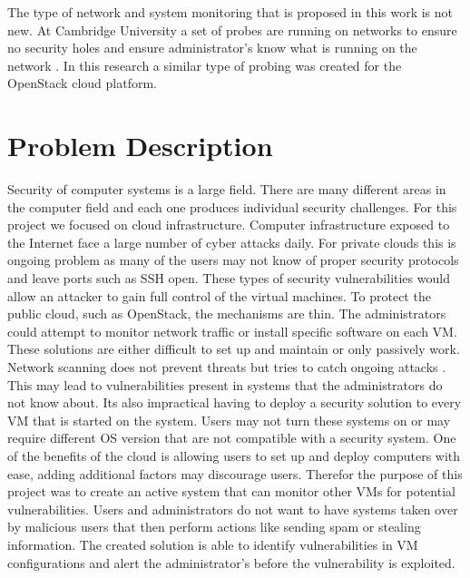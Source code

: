 \documentclass[12pt]{article}
\begin{document}
The type of network and system monitoring that is proposed in this work is not new. At Cambridge University a set of probes are running on networks to ensure no security holes and ensure administrator's know what is running on the network \cite{CambUni}. In this research a similar type of probing was created for the OpenStack cloud platform.

\section{Problem Description}
Security of computer systems is a large field. There are many different areas in the computer field and each one produces individual security challenges. For this project we focused on cloud infrastructure. Computer infrastructure exposed to the Internet face a large number of cyber attacks daily\cite{cimpanu_2017}. For private clouds this is ongoing problem as many of the users may not know of proper security protocols and leave ports such as SSH open. These types of security vulnerabilities would allow an attacker to gain full control of the virtual machines. To protect the public cloud, such as OpenStack, the mechanisms are thin. The administrators could attempt to monitor network traffic or install specific software on each VM. These solutions are either difficult to set up and maintain or only passively work. Network scanning does not prevent threats but tries to catch ongoing attacks \cite{global}. This may lead to vulnerabilities present in systems that the administrators do not know about. Its also impractical having to deploy a security solution to every VM that is started on the system. Users may not turn these systems on or may require different OS version that are not compatible with a security system. One of the benefits of the cloud is allowing users to set up and deploy computers with ease, adding additional factors may discourage users. Therefor the purpose of this project was to create an active system that can monitor other VMs for potential vulnerabilities. Users and administrators do not want to have systems taken over by malicious users that then perform actions like sending spam or stealing information. The created solution is able to identify vulnerabilities in VM configurations and alert the administrator's before the vulnerability is exploited.
\end{document}
